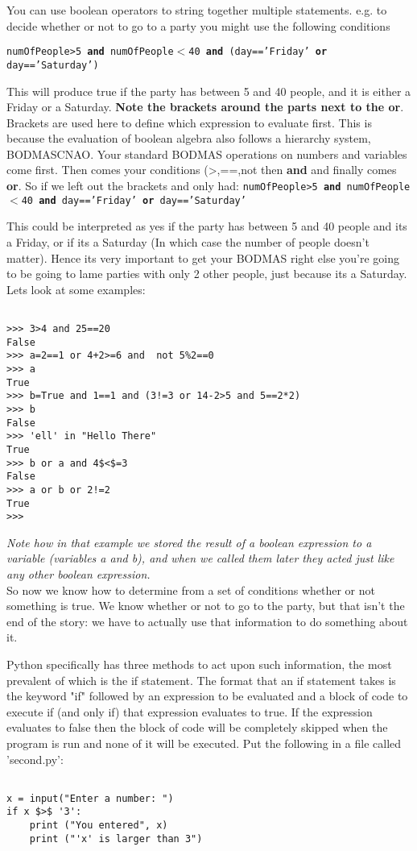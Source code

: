  You can use boolean operators to string together multiple statements. e.g. to decide whether or not to go to a party you might use the following conditions


\texttt{numOfPeople>5 \textbf{and} numOfPeople$<$40 \textbf{and} (day=='Friday' \textbf{or} day=='Saturday')}

 This will produce true if the party has between 5 and 40 people, and it is either a Friday or a Saturday. \textbf{Note the brackets around the parts next to the or}. Brackets are used here to define which expression to evaluate first. This is because the evaluation of boolean algebra also follows a hierarchy system, BODMASCNAO. Your standard BODMAS operations on numbers and variables come first. Then comes your conditions (>,==,not then \textbf{and} and finally comes \textbf{or}. So if we left out the brackets and only had: 
\texttt{numOfPeople>5 \textbf{and} numOfPeople$<$40 \textbf{and} day=='Friday' \textbf{or} day=='Saturday'}

 This could be interpreted as yes if the party has between 5 and 40 people and its a Friday, or if its a Saturday (In which case the number of people doesn't matter). Hence its very important to get your BODMAS right else you're going to be going to lame parties with only 2 other people, just because its a Saturday. Lets look at some examples:
\begin{lstlisting}
		
>>> 3>4 and 25==20
False
>>> a=2==1 or 4+2>=6 and  not 5%2==0
>>> a
True
>>> b=True and 1==1 and (3!=3 or 14-2>5 and 5==2*2)
>>> b
False
>>> 'ell' in "Hello There"
True
>>> b or a and 4$<$=3
False
>>> a or b or 2!=2
True
>>>
		\end{lstlisting}

\textit{Note how in that example we stored the result of a boolean expression to a variable (variables a and b), and when we called them later they acted just like any other boolean expression.}
\\ So now we know how to determine from a set of conditions whether or not something is true. We know whether or not to go to the party, but that isn't the end of the story: we have to actually use that information to do something about it.

Python specifically has three methods to act upon such information, the most prevalent of which is the if statement. The format that an if statement                 takes is the keyword "if" followed by an expression to be evaluated and a block of code to execute if (and only if) that expression evaluates to true. If the expression evaluates to false                 then the block of code will be completely skipped when the program is run and none of it will be executed.                 Put the   following in a file called 'second.py':
\begin{lstlisting}

x = input("Enter a number: ")
if x $>$ '3':
    print ("You entered", x)
    print ("'x' is larger than 3")
\end{lstlisting}

